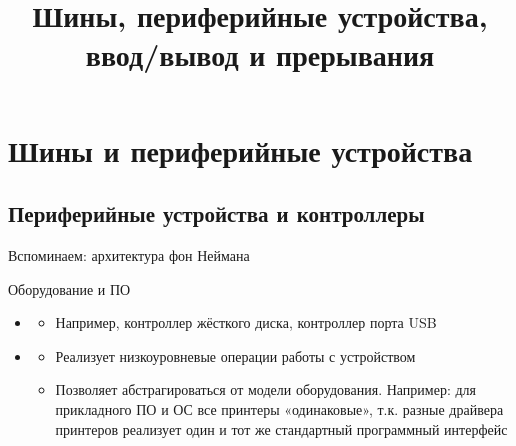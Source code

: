 \documentclass[xetex,aspectratio=43]{beamer}
\title[Шины и периферийные устройства]{Шины, периферийные устройства, ввод/вывод и прерывания}
\begin{document}
\titleslide

\tocslide

\section{Шины и периферийные устройства}

\subsection{Периферийные устройства и контроллеры}

\begin{frame}{Вспоминаем: архитектура фон Неймана}
	\begin{figure}
		
	\end{figure}
\end{frame}

\begin{frame}{Оборудование и ПО}
	\begin{itemize}
		\item
		
		\begin{itemize}
			\item
			Например, контроллер жёсткого диска, контроллер порта USB
		\end{itemize}
		\item
		
		\begin{itemize}
			\item
			Реализует низкоуровневые операции работы с устройством
			\item
			Позволяет абстрагироваться от модели оборудования.
			Например: для прикладного ПО и ОС все принтеры «одинаковые», т.к. разные драйвера принтеров реализует один и тот же стандартный программный интерфейс
		\end{itemize}
	\end{itemize}
\end{frame}
\end{document}
